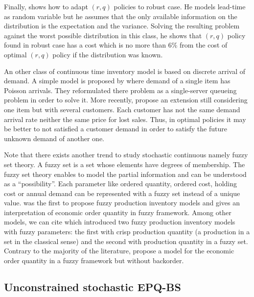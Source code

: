 Finally, \citet{Gallego1998} shows how to adapt $(r,q)$ policies to robust case.
He models lead-time as random variable but he assumes that the only available information on the distribution is the expectation and the variance.
Solving the resulting problem against the worst possible distribution in this class, he shows that $(r,q)$ policy found in robust case has a cost which is no more than 6\% from the cost of optimal $(r,q)$ policy if the distribution was known.


\medskip


An other class of continuous time inventory model is based on discrete arrival of demand.
A simple model is proposed by \citet{Gavish1980} where demand of a single item has Poisson arrivals.
They reformulated there problem as a single-server queueing problem in order to solve it.
More recently, \citet{Gayon2009} propose an extension still considering one item but with several customers.
Each customer has not the same demand arrival rate neither the same price for lost sales.
Thus, in optimal policies it may be better to not satisfied a customer demand in order to satisfy the future unknown demand of another one.


\medskip


Note that there exists another trend to study stochastic continuous namely fuzzy set theory.
A fuzzy set is a set whose elements have degrees of membership.
The fuzzy set theory enables to model the partial information and can be understood as a ``possibility''.
Each parameter like ordered quantity, ordered cost, holding cost or annual demand can be represented with a fuzzy set instead of a unique value.
\citet{Park1987} was the first to propose fuzzy production inventory models and gives an interpretation of economic order quantity in fuzzy framework.
Among other models, we can cite \citet{Hsieh2002} which introduced two fuzzy production inventory models with fuzzy parameters: the first with crisp production quantity (\ie a production in a set in the classical sense) and the second with production quantity in a fuzzy set.
Contrary to the majority of the literature, \citet{Lee1999} propose a model for the economic order quantity in a fuzzy framework but without backorder.






\subsection{Unconstrained stochastic EPQ-BS}


